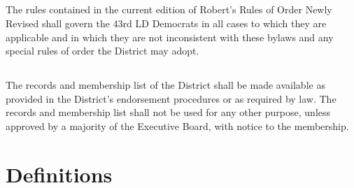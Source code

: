 \documentclass{article}
\newcommand{\fortythird}{\nth{43}}
\newcommand{\district}{\fortythird{} District}
\newcommand{\thedistrict}{the \district{}}
\begin{document}
\subsection{}
The rules contained in the current edition of Robert’s Rules of Order Newly Revised shall govern the 43rd LD Democrats in all cases to which they are applicable and in which they are not inconsistent with these bylaws and any special rules of order \thedistrict{} may adopt.

\subsection{}
The records and membership list of \thedistrict{} shall be made available as provided in \thedistrict{}’s endorsement procedures or as required by law. The records and membership list shall not be used for any other purpose, unless approved by a majority of the Executive Board, with notice to the membership.

\section{Definitions}
\end{document}
